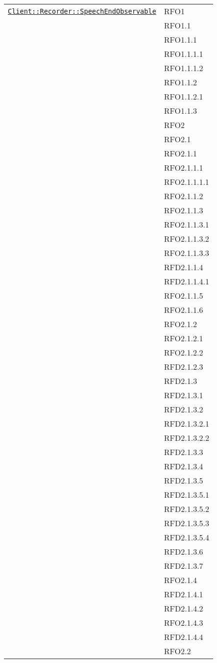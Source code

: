 \begin{longtable}{|>{\centering}m{10cm}|m{3cm}<{\centering}|}
\hyperref[Client::Recorder::SpeechEndObservable]{\texttt{Client::Recorder::SpeechEndObservable}} & RFO1\\
& RFO1.1\\
& RFO1.1.1\\
& RFO1.1.1.1\\
& RFO1.1.1.2\\
& RFO1.1.2\\
& RFO1.1.2.1\\
& RFO1.1.3\\
& RFO2\\
& RFO2.1\\
& RFO2.1.1\\
& RFO2.1.1.1\\
& RFO2.1.1.1.1\\
& RFO2.1.1.2\\
& RFO2.1.1.3\\
& RFO2.1.1.3.1\\
& RFO2.1.1.3.2\\
& RFO2.1.1.3.3\\
& RFD2.1.1.4\\
& RFD2.1.1.4.1\\
& RFO2.1.1.5\\
& RFO2.1.1.6\\
& RFO2.1.2\\
& RFO2.1.2.1\\
& RFO2.1.2.2\\
& RFD2.1.2.3\\
& RFD2.1.3\\
& RFD2.1.3.1\\
& RFD2.1.3.2\\
& RFD2.1.3.2.1\\
& RFD2.1.3.2.2\\
& RFD2.1.3.3\\
& RFD2.1.3.4\\
& RFD2.1.3.5\\
& RFD2.1.3.5.1\\
& RFD2.1.3.5.2\\
& RFD2.1.3.5.3\\
& RFD2.1.3.5.4\\
& RFD2.1.3.6\\
& RFD2.1.3.7\\
& RFO2.1.4\\
& RFD2.1.4.1\\
& RFD2.1.4.2\\
& RFO2.1.4.3\\
& RFD2.1.4.4\\
& RFO2.2\\

\end{longtable}
